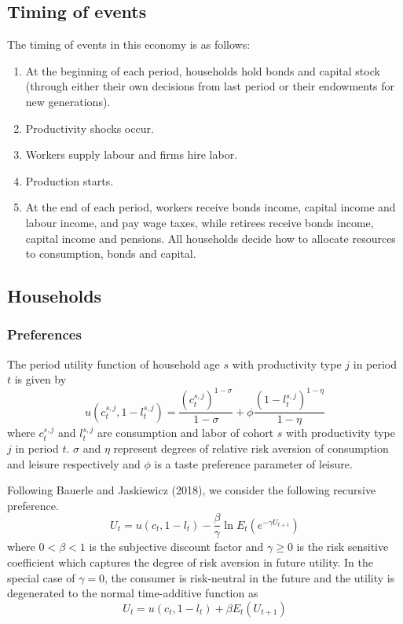 \documentclass[12pt]{article}
\begin{document}
\subsection{Timing of events}
The timing of events in this economy is as follows:
\begin{enumerate}
	\item At the beginning of each period, households hold bonds and capital stock (through either their own decisions from last period or their endowments for new generations).
	\item Productivity shocks occur.
	\item Workers supply labour and firms hire labor.
	\item Production starts. 
	\item At the end of each period, workers receive bonds income, capital income and labour income, and pay wage taxes, while retirees receive bonds income, capital income and pensions. All households decide how to allocate resources to consumption, bonds and capital. 
\end{enumerate}

\subsection{Households}
\subsubsection{Preferences}
The period utility function of household age $s$ with productivity type $j$ in period $t$ is given by
\begin{equation}
u\left(c^{s,j}_t,1-l^{s,j}_t\right)=\frac{(c^{s,j}_t)^{1-\sigma}}{1-\sigma}+\phi \frac{(1-l^{s,j}_t)^{1-\eta}}{1-\eta}
\end{equation}
where $c^{s,j}_t$ and $l^{s,j}_t$ are consumption and labor of cohort $s$ with productivity type $j$ in period $t$. $\sigma$ and $\eta$ represent degrees of relative risk aversion of consumption and leisure respectively and $\phi$ is a taste preference parameter of leisure.

Following Bauerle and Jaskiewicz (2018), we consider the following recursive preference.
\begin{equation}
	U_t=u(c_t,{1-l}_t) - {\frac{\beta}{\gamma}}\ln E_t(e^{{-\gamma}{U_{t+1}}})
\end{equation}
where $0<\beta<1$ is the subjective discount factor and $\gamma\geq 0$ is the risk sensitive coefficient which captures the degree of risk aversion in future utility. In the special case of $\gamma=0$, the consumer is risk-neutral in the future and the utility is degenerated to the normal time-additive function as
\begin{equation}
U_t=u(c_t,{1-l}_t) + \beta E_t(U_{t+1})
\end{equation}
\end{document}
